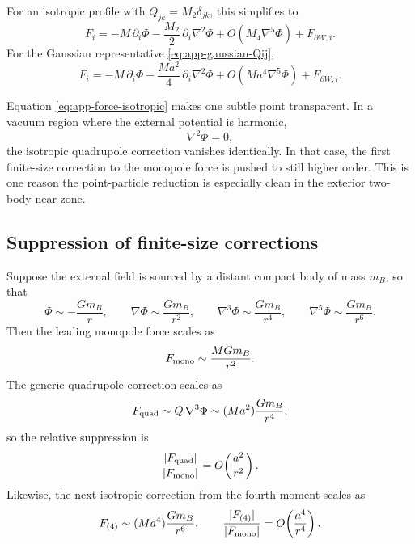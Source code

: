 \documentclass[11pt]{article}
\newcommand{\PhiN}{\Phi}
\begin{document}
For an isotropic profile with \(Q_{jk}=M_2\delta_{jk}\), this simplifies to
\begin{equation}
F_i
=
- M\,\partial_i\PhiN
-\frac{M_2}{2}\,\partial_i\nabla^2\PhiN
+O(M_4\nabla^5\PhiN)
+
F_{\partial W,i}.
\label{eq:app-force-isotropic}
\end{equation}
For the Gaussian representative \eqref{eq:app-gaussian-Qij},
\begin{equation}
F_i
=
- M\,\partial_i\PhiN
-\frac{Ma^2}{4}\,\partial_i\nabla^2\PhiN
+O(Ma^4\nabla^5\PhiN)
+
F_{\partial W,i}.
\label{eq:app-force-gaussian}
\end{equation}

Equation \eqref{eq:app-force-isotropic} makes one subtle point transparent. In a vacuum
region where the external potential is harmonic,
\begin{equation}
\nabla^2\PhiN=0,
\label{eq:app-harmonic-vacuum}
\end{equation}
the isotropic quadrupole correction vanishes identically. In that case, the first
finite-size correction to the monopole force is pushed to still higher order. This is one
reason the point-particle reduction is especially clean in the exterior two-body near
zone.

\subsection{Suppression of finite-size corrections}
\label{app:moments-suppression}

Suppose the external field is sourced by a distant compact body of mass \(m_B\), so that
\begin{equation}
\PhiN\sim -\frac{Gm_B}{r},
\qquad
\nabla\PhiN\sim \frac{Gm_B}{r^2},
\qquad
\nabla^3\PhiN\sim \frac{Gm_B}{r^4},
\qquad
\nabla^5\PhiN\sim \frac{Gm_B}{r^6}.
\label{eq:app-potential-scaling}
\end{equation}
Then the leading monopole force scales as
\begin{equation}
F_{\rm mono}\sim \frac{MGm_B}{r^2}.
\label{eq:app-Fmono-scaling}
\end{equation}
The generic quadrupole correction scales as
\begin{equation}
F_{\rm quad}\sim Q\,\nabla^3\PhiN
\sim
(Ma^2)\frac{Gm_B}{r^4},
\label{eq:app-Fquad-scaling}
\end{equation}
so the relative suppression is
\begin{equation}
\frac{|F_{\rm quad}|}{|F_{\rm mono}|}
=
O\!\left(\frac{a^2}{r^2}\right).
\label{eq:app-quad-suppression}
\end{equation}
Likewise, the next isotropic correction from the fourth moment scales as
\begin{equation}
F_{(4)}
\sim
(Ma^4)\frac{Gm_B}{r^6},
\qquad
\frac{|F_{(4)}|}{|F_{\rm mono}|}
=
O\!\left(\frac{a^4}{r^4}\right).
\label{eq:app-fourth-suppression}
\end{equation}
\end{document}
